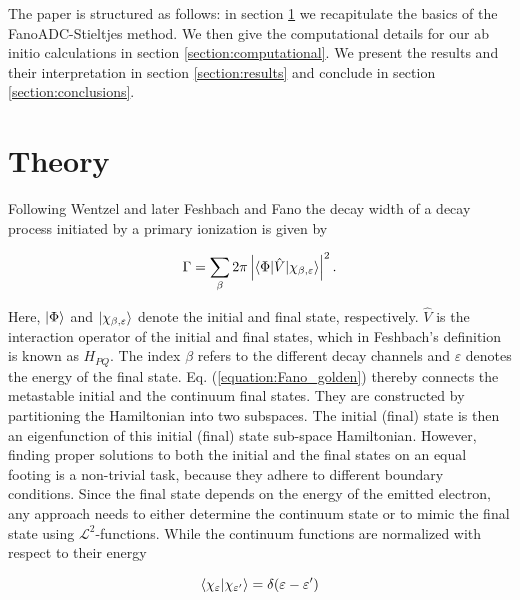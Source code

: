 \documentclass[aps,amssymb,preprint,a4paper,longbibliography]{revtex4}
\begin{document}
The paper is structured as follows:
in section \ref{section:theory} we recapitulate the basics of the
FanoADC-Stieltjes method. We then give the computational details for our
ab initio calculations in section \ref{section:computational}. We present the
results and their interpretation in section \ref{section:results}
and conclude in section \ref{section:conclusions}.

%

\section{Theory}
\label{section:theory}

Following Wentzel \cite{Wentzel27} and later Feshbach \cite{Feshbach58,Feshbach62}
and Fano \cite{Fano61}
the decay width of a decay process initiated by a
primary ionization is given by 

\begin{equation} \label{equation:Fano_golden}
  \Gamma = \sum_\beta 2\pi
           \left| \braket{\Phi|\hat{V}|\chi_{\beta,\varepsilon}} \right|^2 .
\end{equation}

Here, $\ket{\Phi}$ and $\ket{\chi_{\beta,\varepsilon}}$ denote the initial and
final state, respectively. $\hat{V}$ is the interaction operator of the
initial and final states, which in Feshbach's definition is known as $H_{PQ}$.
The index $\beta$ refers to the different
decay channels and $\varepsilon$ denotes the energy of the final state.
Eq. (\ref{equation:Fano_golden}) thereby connects the metastable initial
and the continuum final states. They are constructed by partitioning the
Hamiltonian into two subspaces. The initial (final) state is then an
eigenfunction of this initial (final) state sub-space Hamiltonian.
However, finding proper solutions to both the initial and the final
states on an equal footing is a non-trivial task, because they adhere to
different boundary conditions. Since the final state depends on the energy
of the emitted electron, any approach needs to either determine the continuum
state or to mimic the final state using $\mathcal{L}^2$-functions.
While the continuum functions are normalized with respect to their energy

\begin{equation}
 \braket{\chi_\varepsilon| \chi_{\varepsilon'}} = \delta(\varepsilon-\varepsilon')
\end{equation}
\end{document}
